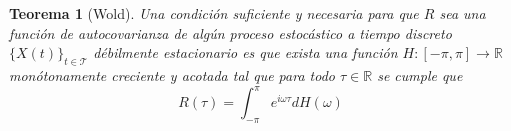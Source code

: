 \documentclass[12pt,letterpaper]{book}
\newtheorem{teorema}{Teorema}[chapter]
\newcommand{\R}{\mathbb{R}}
\newcommand{\intPI}{\int_{-\pi}^{\pi}}
\newcommand{\xt}{$\{X(t)\}_{t\in \mathcal{T}}$ }
\newcommand{\hz}{\si{\hertz}\xspace}
\begin{document}

\begin{teorema}[Wold]
\label{t_wold}
Una condición suficiente y necesaria para que $R$ sea una función de autocovarianza de algún proceso estocástico a tiempo discreto \xt débilmente estacionario es que exista una función $H:[-\pi,\pi]\rightarrow\R$ monótonamente creciente y acotada tal que para todo $\tau \in \R$ se cumple que
\begin{equation*}
R(\tau) = \intPI e^{i \omega \tau} dH(\omega)
\end{equation*}
\end{teorema}
\end{document}
